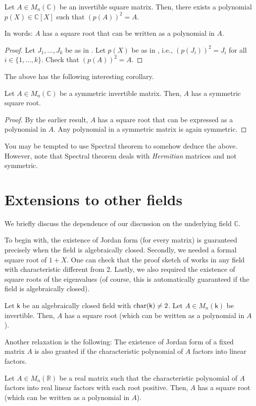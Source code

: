 \documentclass[12pt]{article}
\begin{document}
\begin{thm}
	Let $A \in M_{n}(\mathbb{C})$ be an invertible square matrix. Then, there exists a polynomial $p(X) \in \mathbb{C}[X]$ such that $(p(A))^{2} = A$. 

	In words: $A$ has a square root that can be written as a polynomial in $A$.
\end{thm}
\begin{proof} 
	Let $J_{1}, \ldots, J_{k}$ be as in . Let $p(X)$ be as in , i.e., $(p(J_{i}))^{2} = J_{i}$ for all $i \in \{1, \ldots, k\}$. Check that $(p(A))^{2} = A$.
\end{proof}

The above has the following interesting corollary.
\begin{cor}
	Let $A \in M_{n}(\mathbb{C})$ be a symmetric invertible matrix. Then, $A$ has a symmetric square root.
\end{cor}
\begin{proof} 
	By the earlier result, $A$ has a square root that can be expressed as a polynomial in $A$. Any polynomial in a symmetric matrix is again symmetric.
\end{proof}

\begin{rem}
	You may be tempted to use Spectral theorem to somehow deduce the above. However, note that Spectral theorem deals with \emph{Hermitian} matrices and not symmetric.
\end{rem}

\section{Extensions to other fields}

We briefly discuss the dependence of our discussion on the underlying field $\mathbb{C}$. 

To begin with, the existence of Jordan form (for every matrix) is guaranteed precisely when the field is algebraically closed. Secondly, we needed a formal square root of $1 + X$. One can check that the proof sketch of  works in any field with characteristic different from $2$. Lastly, we also required the existence of square roots of the eigenvalues (of course, this is automatically guaranteed if the field is algebraically closed). 

\begin{thm}
	Let $\mathsf{k}$ be an algebraically closed field with $\operatorname{char}(\mathsf{k}) \neq 2$. Let $A \in M_{n}(\mathsf{k})$ be invertible. Then, $A$ has a square root (which can be written as a polynomial in $A$).
\end{thm}

Another relaxation is the following: The existence of Jordan form of a fixed matrix $A$ is also granted if the characteristic polynomial of $A$ factors into linear factors. 

\begin{thm}
	Let $A \in M_{n}(\mathbb{R})$ be a real matrix such that the characteristic polynomial of $A$ factors into real linear factors with each root positive. Then, $A$ has a square root (which can be written as a polynomial in $A$).
\end{thm}
\end{document}
